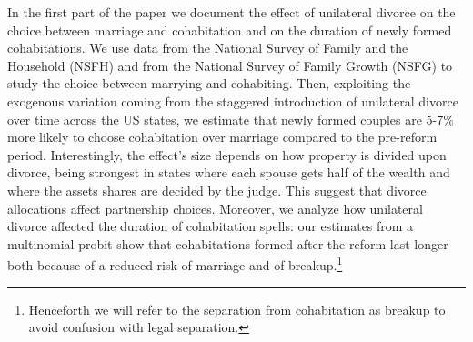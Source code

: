 \documentclass[12pt]{article}
\numberwithin{table}{section}
\begin{document}

In the first part of the paper we document the effect of unilateral divorce on the choice between marriage and cohabitation and on the duration of newly formed cohabitations. We use data from the National Survey of Family and the Household (NSFH) and from the National Survey of Family Growth (NSFG) to study the choice between marrying and cohabiting. Then, exploiting the exogenous variation coming from the staggered introduction of unilateral divorce over time across the US states, we estimate that newly formed couples are 5-7\% more likely to choose cohabitation over marriage compared to the pre-reform period. Interestingly, the effect's size depends on how property is divided upon divorce, being strongest in states where each spouse gets half of the wealth and where the assets shares are decided by the judge. This suggest that divorce allocations affect partnership choices.
Moreover, we analyze how unilateral divorce affected the duration of cohabitation spells: our estimates from a multinomial probit show that cohabitations formed after the reform last longer both because of a reduced risk of marriage and of breakup.\footnote{Henceforth we will refer to the separation from cohabitation as breakup to avoid confusion with legal separation.}
\end{document}

